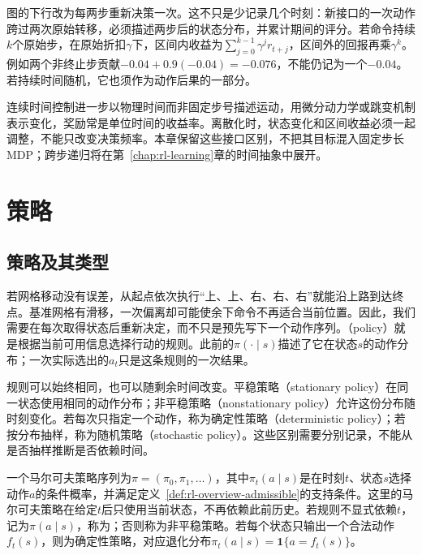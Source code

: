 图的下行改为每两步重新决策一次。这不只是少记录几个时刻：新接口的一次动作跨过两次原始转移，必须描述两步后的状态分布，并累计期间的评分。若命令持续$k$个原始步，在原始折扣$\gamma$下，区间内收益为$\sum_{j=0}^{k-1}\gamma^j r_{t+j}$，区间外的回报再乘$\gamma^k$。例如两个非终止步贡献$-0.04+0.9(-0.04)=-0.076$，不能仍记为一个$-0.04$。若持续时间随机，它也须作为动作后果的一部分。

连续时间控制进一步以物理时间而非固定步号描述运动，用微分动力学或跳变机制表示变化，奖励常是单位时间的收益率。离散化时，状态变化和区间收益必须一起调整，不能只改变决策频率。本章保留这些接口区别，不把其目标混入固定步长MDP；跨步递归将在第~\ref{chap:rl-learning}章的时间抽象中展开。

\section{策略}
\label{sec:rl-overview-policies}

\subsection{策略及其类型}
\label{sec:rl-overview-policy-types}

若网格移动没有误差，从起点依次执行“上、上、右、右、右”就能沿上路到达终点。基准网格有滑移，一次偏离却可能使余下命令不再适合当前位置。因此，我们需要在每次取得状态后重新决定，而不只是预先写下一个动作序列。（policy）就是根据当前可用信息选择行动的规则。此前的$\pi(\cdot\mid s)$描述了它在状态$s$的动作分布；一次实际选出的$a_t$只是这条规则的一次结果。

规则可以始终相同，也可以随剩余时间改变。平稳策略（stationary policy）在同一状态使用相同的动作分布；非平稳策略（nonstationary policy）允许这份分布随时刻变化。若每次只指定一个动作，称为确定性策略（deterministic policy）；若按分布抽样，称为随机策略（stochastic policy）。这些区别需要分别记录，不能从是否抽样推断是否依赖时间。

\begin{definition}[马尔可夫策略]
  \label{def:rl-overview-policy}
  一个马尔可夫策略序列为$\pi=(\pi_0,\pi_1,\ldots)$，其中$\pi_t(a\mid s)$是在时刻$t$、状态$s$选择动作$a$的条件概率，并满足定义~\ref{def:rl-overview-admissible}的支持条件。这里的马尔可夫策略在给定$t$后只使用当前状态，不再依赖此前历史。若规则不显式依赖$t$，记为$\pi(a\mid s)$，称为；否则称为非平稳策略。若每个状态只输出一个合法动作$f_t(s)$，则为确定性策略，对应退化分布$\pi_t(a\mid s)=\mathbf 1\{a=f_t(s)\}$。
\end{definition}


